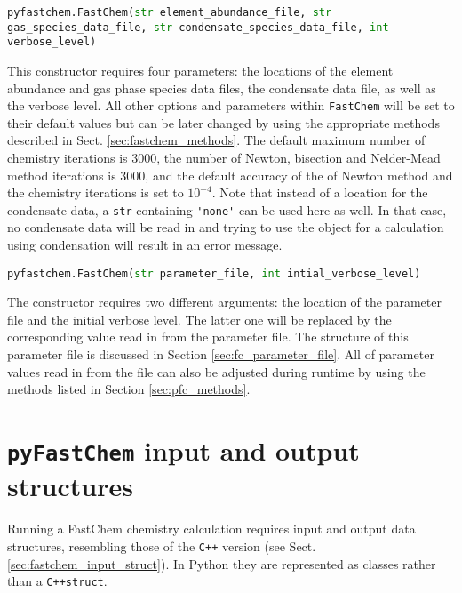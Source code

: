 \documentclass[numbers=noenddot]{aux/fcmanual}
\newcommand{\fc}{\texttt{FastChem}\xspace}
\newcommand{\pfc}{\texttt{pyFastChem}\xspace}
\newcommand{\cpp}{\ttt{C++}\xspace}
\newcommand{\ttt}[1]{\texttt {#1}}
\begin{document}
\bigbreak

\lstinline[language=Python, breaklines=true]!pyfastchem.FastChem(str element_abundance_file, str gas_species_data_file, str condensate_species_data_file, int verbose_level)!
\begin{addmargin}[25pt]{0pt}
	This constructor requires four parameters: the locations of the element abundance and gas phase species data files, the condensate data file, as well as the verbose level. All other options and parameters within \fc will be set to their default values but can be later changed by using the appropriate methods described in Sect. \ref{sec:fastchem_methods}. The default maximum number of chemistry iterations is 3000, the number of Newton, bisection and Nelder-Mead method iterations is 3000, and the default accuracy of the of Newton method and the chemistry iterations is set to $10^{-4}$. Note that instead of a location for the condensate data, a \lstinline!str! containing \lstinline!'none'! can be used here as well. In that case, no condensate data will be read in and trying to use the object for a calculation using condensation will result in an error message.
\end{addmargin}

\bigbreak


\lstinline[language=Python]!pyfastchem.FastChem(str parameter_file, int intial_verbose_level)!
\begin{addmargin}[25pt]{0pt}
	The constructor requires two different arguments: the location of the parameter file and the initial verbose level. The latter one will be replaced by the corresponding value read in from the parameter file. The structure of this parameter file is discussed in Section \ref{sec:fc_parameter_file}. All of parameter values read in from the file can also be adjusted during runtime by using the methods listed in Section \ref{sec:pfc_methods}.
\end{addmargin}

\pagebreak

\section{\pfc input and output structures}
\label{sec:pfc_input_ouput_struct}

Running a FastChem chemistry calculation requires input and output data structures, resembling those of the \cpp version (see Sect. \ref{sec:fastchem_input_struct}). In Python they are represented as classes rather than a \cpp \lstinline!struct!.
\end{document}
